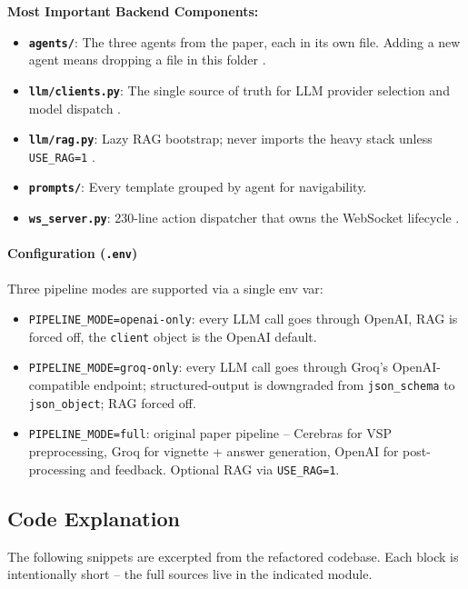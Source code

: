 \documentclass{article}
\begin{document}
\textbf{Most Important Backend Components:}
\begin{itemize}
    \item \textbf{\texttt{agents/}}: The three agents from the paper, each in its own file. Adding a new agent means dropping a file in this folder \cite{Cheptsov2013IntroducingAN}.
    \item \textbf{\texttt{llm/clients.py}}: The single source of truth for LLM provider selection and model dispatch \cite{Kulkarni2023TheEO}.
    \item \textbf{\texttt{llm/rag.py}}: Lazy RAG bootstrap; never imports the heavy stack unless \texttt{USE\_RAG=1} \cite{Monir2024VectorSearchED}.
    \item \textbf{\texttt{prompts/}}: Every template grouped by agent for navigability.
    \item \textbf{\texttt{ws\_server.py}}: 230-line action dispatcher that owns the WebSocket lifecycle \cite{Rygl2017SemanticVE}.
\end{itemize}

\paragraph{Configuration (\texttt{.env})}
Three pipeline modes are supported via a single env var:
\begin{itemize}
    \item \texttt{PIPELINE\_MODE=openai-only}: every LLM call goes through OpenAI, RAG is forced off, the \texttt{client} object is the OpenAI default.
    \item \texttt{PIPELINE\_MODE=groq-only}: every LLM call goes through Groq's OpenAI-compatible endpoint; structured-output is downgraded from \texttt{json\_schema} to \texttt{json\_object}; RAG forced off.
    \item \texttt{PIPELINE\_MODE=full}: original paper pipeline -- Cerebras for VSP preprocessing, Groq for vignette + answer generation, OpenAI for post-processing and feedback. Optional RAG via \texttt{USE\_RAG=1}.
\end{itemize}

\newpage
\subsection{Code Explanation}

The following snippets are excerpted from the refactored codebase. Each block is intentionally short -- the full sources live in the indicated module.
\end{document}
